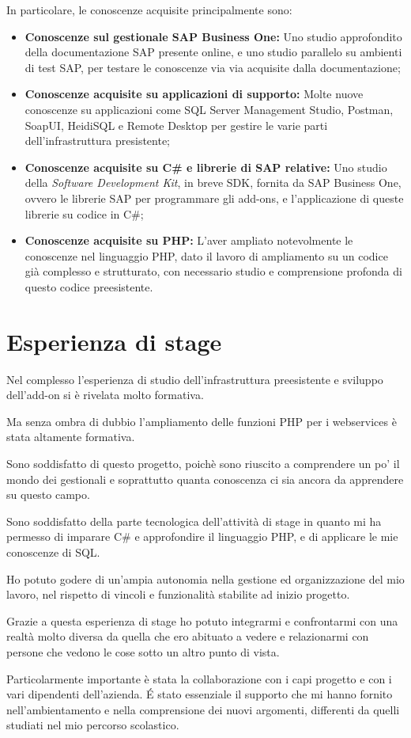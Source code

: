 In particolare, le conoscenze acquisite principalmente sono:
\begin{itemize}
    \item \textbf{Conoscenze sul gestionale SAP Business One: }Uno studio approfondito della documentazione SAP presente online, e uno studio parallelo su ambienti di test SAP, per testare le conoscenze via via acquisite dalla documentazione;
    \item \textbf{Conoscenze acquisite su applicazioni di supporto: } Molte nuove conoscenze su applicazioni come SQL Server Management Studio, Postman, SoapUI, HeidiSQL e Remote Desktop per gestire le varie parti dell'infrastruttura presistente;
    \item \textbf{Conoscenze acquisite su C\# e librerie di SAP relative: } Uno studio della \textit{Software Development Kit}, in breve SDK, fornita da SAP Business One, ovvero le librerie SAP per programmare gli add-ons, e l'applicazione di queste librerie su codice in C\#;
    \item \textbf{Conoscenze acquisite su PHP: } L'aver ampliato notevolmente le conoscenze nel linguaggio PHP, dato il lavoro di ampliamento su un codice già complesso e strutturato, con necessario studio e comprensione profonda di questo codice preesistente.
\end{itemize}

\section{Esperienza di stage}
\begin{flushleft}
Nel complesso l'esperienza di studio dell'infrastruttura preesistente e sviluppo dell'add-on si è rivelata molto formativa.

Ma senza ombra di dubbio l'ampliamento delle funzioni PHP per i webservices è stata altamente formativa.

\newspace

Sono soddisfatto di questo progetto, poichè sono riuscito a comprendere un po' il mondo dei gestionali e soprattutto quanta conoscenza ci sia ancora da apprendere su questo campo.

Sono soddisfatto della parte tecnologica dell'attività di stage in quanto mi ha permesso di imparare C\# e approfondire il linguaggio PHP, e di applicare le mie conoscenze di SQL.

\newspace

Ho potuto godere di un'ampia autonomia nella gestione ed organizzazione del mio lavoro, nel rispetto di vincoli e funzionalità stabilite ad inizio progetto.

Grazie a questa esperienza di stage ho potuto integrarmi e confrontarmi con una realtà molto diversa da quella che ero abituato a vedere e relazionarmi con persone che vedono le cose sotto un altro punto di vista.

Particolarmente importante è stata la collaborazione con i capi progetto e con i vari dipendenti dell'azienda. \'E stato essenziale il supporto che mi hanno fornito nell'ambientamento e nella comprensione dei nuovi argomenti, differenti da quelli studiati nel mio percorso scolastico.
\end{flushleft}